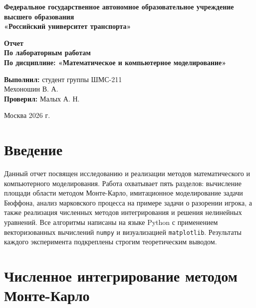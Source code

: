 \documentclass[a4paper,14pt]{extarticle}
\begin{document}
\begin{titlepage}
\begin{center}
\textbf{Федеральное государственное автономное образовательное учреждение \\ высшего образования \\ «Российский университет транспорта»}

\vspace{5cm}
\textbf{\Large Отчет} \\
\vspace{0.5cm}
\textbf{По лабораторным работам} \\
\textbf{По дисциплине: «Математическое и компьютерное моделирование»}
\end{center}

\vspace{5cm}
\begin{flushright}
\textbf{Выполнил:} студент группы ШМС-211 \\ Мехоношин В. А. \\
\textbf{Проверил:} Малых А. Н.
\end{flushright}

\vfill
\begin{center}
Москва 2026 г.
\end{center}
\end{titlepage}

\newpage
\tableofcontents
\newpage

\section*{Введение}
Данный отчет посвящен исследованию и реализации методов математического и компьютерного моделирования. Работа охватывает пять разделов: вычисление площади области методом Монте-Карло, имитационное моделирование задачи Бюффона, анализ марковского процесса на примере задачи о разорении игрока, а также реализация численных методов интегрирования и решения нелинейных уравнений. Все алгоритмы написаны на языке Python с применением векторизованных вычислений \texttt{numpy} и визуализацией \texttt{matplotlib}. Результаты каждого эксперимента подкреплены строгим теоретическим выводом.

\newpage

\section{Численное интегрирование методом Монте-Карло}
\end{document}
